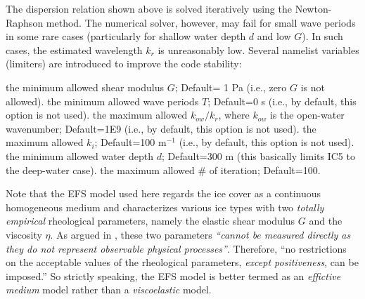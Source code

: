 The dispersion relation shown above is solved iteratively using the Newton-Raphson method. The numerical solver, however, may fail for small wave periods in some rare cases (particularly for shallow water depth $d$ and low $G$). In such cases, the estimated wavelength $k_r$ is unreasonably low. Several namelist variables (limiters) are introduced to improve the code stability:
\begin{clist}
 {the minimum allowed shear modulus $G$; Default= 1 Pa (i.e., zero $G$ is not allowed).}
%
 {the minimum allowed wave periods $T$; Default=0 s (i.e., by default, this option is not used).}
%
 {the maximum allowed $k_{ow}/k_r$, where $k_{ow}$ is the open-water wavenumber; Default=1E9 (i.e., by default, this option is not used).}
%
 {the maximum allowed $k_i$; Default=100 m$^{-1}$ (i.e., by default, this option is not used).}
%
 {the minimum allowed water depth $d$; Default=300 m (this basically limits {\code IC5} to the deep-water case).}
%
 {the maximum allowed \# of iteration; Default=100.}
\end{clist}

Note that the EFS model used here regards the ice cover as a continuous homogeneous medium and characterizes various ice types with two \emph{totally empirical} rheological parameters, namely the elastic shear modulus $G$ and the viscosity $\eta$. As argued in \citet{art:MMS15}, these two parameters \emph{``cannot be measured directly as they do not represent observable physical processes''}. Therefore, ``no restrictions on the acceptable values of the rheological parameters, \emph{except positiveness}, can be imposed.'' So strictly speaking, the EFS model is better termed as an \emph{effictive medium} model rather than a \emph{viscoelastic} model.